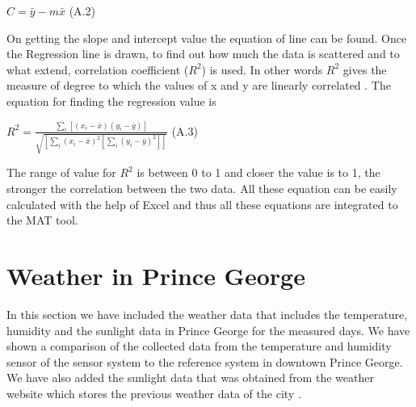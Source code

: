 \begin{center}
 
    { $ C = \bar{y}-m\bar{x}$}     \hspace{3cm}(A.2)

\end{center}


On getting the slope and intercept value the equation of line can be found. Once the Regression line is drawn, to find out how much the data is scattered and to what extend, correlation coefficient ($R^2$) is used. In other words $R^2$ gives the measure of  degree to which the values of x and y are linearly correlated \cite{Stone2001}. The equation for finding the regression value is

\begin{center}

    {\large $R^2 = \frac{\sum_i[(x_i-\bar x)(y_i-\bar y)]}{\sqrt{[\sum_i(x_i-\bar x)^2[\sum_i(y_i-\bar y)^2]]}}$ }  \hspace{2cm}(A.3)

\end{center}
The range of value for $R^2$ is between 0 to 1 and closer the value is to 1, the stronger the correlation between the two data.
All these equation can be easily calculated with the help of Excel and thus all these equations are integrated to the MAT tool.



\newpage

\section{Weather in Prince George}

In this section we have included the weather data that includes the temperature, humidity and the sunlight data in Prince George for the measured days. We have shown a comparison of the collected data from the temperature and humidity sensor of the sensor system to the reference system in downtown Prince George. We have also added the  sunlight data that was obtained from the weather website which stores the previous weather data of the city \cite{sunlight}. 




